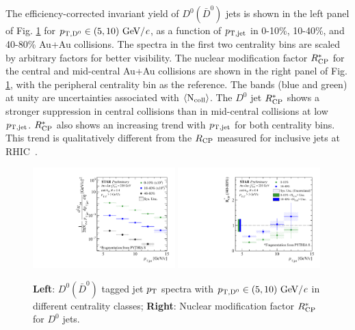 \documentclass{appolb}
\begin{document}

The efficiency-corrected invariant yield of $D^{0} (\bar{D}^{0})$ jets is shown in the left panel of Fig. \ref{fig:Spectrum} for $p_{\rm T, D^{0}} \in (5, 10) \text{ GeV}/\textit{c}$, as a function of $p_{\rm T,jet}$ in \mbox{0-10\%}, 10-40\%, and 40-80\% Au+Au collisions. The spectra in the first two centrality bins are scaled by arbitrary factors for better visibility. The nuclear modification factor $R_{\rm CP}^*$ for the central and mid-central Au+Au collisions are shown in the right panel of Fig. \ref{fig:Spectrum}, with the peripheral centrality bin as the reference. The bands (blue and green) at unity are uncertainties associated with $\left\langle\rm N_{\rm coll}\right\rangle$. The $D^{0}$ jet $R_{\rm CP}^*$ shows a stronger suppression in central collisions than in mid-central collisions at low $p_{\rm T, jet}$. $R_{\rm CP}^*$ also shows an increasing trend with $p_{\rm T, jet}$ for both centrality bins. This trend is qualitatively different from the $R_{\rm CP}$ measured for inclusive jets at \mbox{RHIC \cite{InclusiveJetRCPSTAR}.} 

\begin{figure}[h]
    \centering
    \includegraphics[width=0.49\textwidth]{JetPtSpectra_D0Pt5GeV_AuAu200GeV_Run14_STAR.pdf}
    \includegraphics[width=0.49\textwidth]{RCP_D0Pt5GeV_AuAu200GeV_Run14_STAR.pdf}
    \caption{\textbf{Left}: $D^{0} (\bar{D}^{0})$ tagged jet $p_{\rm T}$ spectra with $p_{\rm T, D^{0}} \in (5, 10) \text{ GeV}/\textit{c}$ in different centrality classes; \textbf{Right}: Nuclear modification factor $R_{\rm CP}^*$ for $D^{0}$ jets.}
    \label{fig:Spectrum}
\end{figure}
\end{document}

